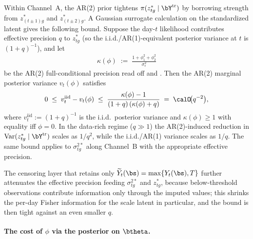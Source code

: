 Within Channel~A, the AR(2) prior tightens $\pi(z^*_{tg} \mid \bY^{\mathrm{tr}})$ by borrowing strength from $z^*_{(t\pm 1)g}$ and $z^*_{(t\pm 2)g}$.  A Gaussian surrogate calculation on the standardized latent gives the following bound.  Suppose the day-$t$ likelihood contributes effective precision $q$ to $z^*_{tg}$ (so the i.i.d./AR(1)-equivalent posterior variance at $t$ is $(1+q)^{-1}$), and let
\begin{align}
  \kappa(\phi) \;:=\; \frac{1 + \phi_1^2 + \phi_2^2}{\sigma_\epsilon^2}
  \label{eq:kappa-disc}
\end{align}
be the AR(2) full-conditional precision read off  and .  Then the AR(2) marginal posterior variance $v_t(\phi)$ satisfies
\begin{align}
  0 \;\le\; v_t^{\mathrm{iid}} - v_t(\phi)
    \;\le\; \frac{\kappa(\phi) - 1}{(1 + q)\,(\kappa(\phi) + q)}
    \;=\; \calO\!\big(q^{-2}\big),
  \label{eq:frozen-bound-disc}
\end{align}
where $v_t^{\mathrm{iid}} := (1 + q)^{-1}$ is the i.i.d.\ posterior variance and $\kappa(\phi) \ge 1$ with equality iff $\phi = 0$.  In the data-rich regime ($q \gg 1$) the AR(2)-induced reduction in $\mathrm{Var}(z^*_{tg} \mid \bY^{\mathrm{tr}})$ scales as $1/q^2$, while the i.i.d./AR(1) variance scales as $1/q$.  The same bound applies to $\sigma^{2*}_{tg}$ along Channel~B with the appropriate effective precision.

The censoring layer that retains only $\widetilde Y_t(\bs) = \max\{Y_t(\bs), T\}$ further attenuates the effective precision feeding $\sigma^{2*}_{tg}$ and $z^*_{tg}$, because below-threshold observations contribute information only through the imputed values; this shrinks the per-day Fisher information for the scale latent in particular, and the bound  is then tight against an even smaller $q$.

\paragraph{The cost of $\phi$ via the posterior on $\btheta$.}

